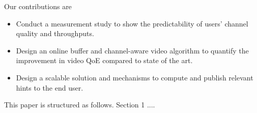 Our contributions are
\begin{itemize}
\item Conduct a measurement study to show the predictability of users' channel quality and throughputs. 
\item Design an online buffer and channel-aware video algorithm to quantify the improvement in video QoE compared to state of the art.
\item Design a scalable solution and mechanisms to compute and publish relevant hints to the end user.
\end{itemize}   

This paper is structured as follows. Section 1 ....
